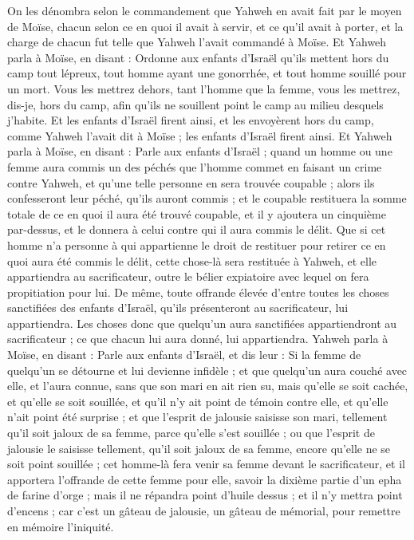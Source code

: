 \begin{multicols}{2}
On les dénombra selon le commandement que Yahweh en avait fait par le moyen de Moïse, chacun selon ce en quoi il avait à servir, et ce qu'il avait à porter, et la charge de chacun fut telle que Yahweh l'avait commandé à Moïse.
\VerseOne{}Et Yahweh parla à Moïse, en disant :
Ordonne aux enfants d'Israël qu'ils mettent hors du camp tout lépreux, tout homme ayant une gonorrhée, et tout homme souillé pour un mort.
Vous les mettrez dehors, tant l'homme que la femme, vous les mettrez, dis-je, hors du camp, afin qu'ils ne souillent point le camp au milieu desquels j'habite.
Et les enfants d'Israël firent ainsi, et les envoyèrent hors du camp, comme Yahweh l'avait dit à Moïse ; les enfants d'Israël firent ainsi.
Et Yahweh parla à Moïse, en disant :
Parle aux enfants d'Israël ; quand un homme ou une femme aura commis un des péchés que l'homme commet en faisant un crime contre Yahweh, et qu'une telle personne en sera trouvée coupable ;
alors ils confesseront leur péché, qu'ils auront commis ; et le coupable restituera la somme totale de ce en quoi il aura été trouvé coupable, et il y ajoutera un cinquième par-dessus, et le donnera à celui contre qui il aura commis le délit.
Que si cet homme n'a personne à qui appartienne le droit de restituer pour retirer ce en quoi aura été commis le délit, cette chose-là sera restituée à Yahweh, et elle appartiendra au sacrificateur, outre le bélier expiatoire avec lequel on fera propitiation pour lui.
De même, toute offrande élevée d'entre toutes les choses sanctifiées des enfants d'Israël, qu'ils présenteront au sacrificateur, lui appartiendra.
 Les choses donc que quelqu'un aura sanctifiées appartiendront au sacrificateur ; ce que chacun lui aura donné, lui appartiendra.
Yahweh parla à Moïse, en disant :
Parle aux enfants d'Israël, et dis leur : Si la femme de quelqu'un se détourne et lui devienne infidèle ;
et que quelqu'un aura couché avec elle, et l'aura connue, sans que son mari en ait rien su, mais qu'elle se soit cachée, et qu'elle se soit souillée, et qu'il n'y ait point de témoin contre elle, et qu'elle n'ait point été surprise ;
et que l'esprit de jalousie saisisse son mari, tellement qu'il soit jaloux de sa femme, parce qu'elle s'est souillée ; ou que l'esprit de jalousie le saisisse tellement, qu'il soit jaloux de sa femme, encore qu'elle ne se soit point souillée ;
cet homme-là fera venir sa femme devant le sacrificateur, et il apportera l'offrande de cette femme pour elle, savoir la dixième partie d'un epha de farine d'orge ; mais il ne répandra point d'huile dessus ; et il n'y mettra point d'encens ; car c'est un gâteau de jalousie, un gâteau de mémorial, pour remettre en mémoire l'iniquité.

\end{multicols}
